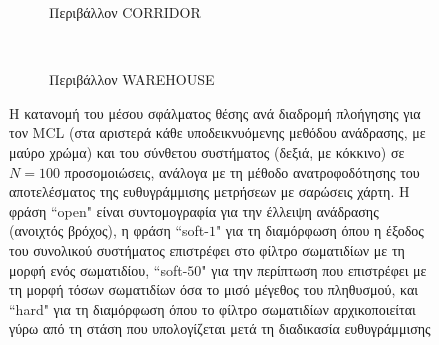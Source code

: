 \begin{figure}
  \vspace{2cm}
  \begin{subfigure}{\linewidth}
  \hspace{-1.25cm}
    
    \vspace{0.3cm}
    \caption{Περιβάλλον CORRIDOR}
    \label{}
  \end{subfigure}\\
  \begin{subfigure}{\linewidth}\vspace{0.5cm}
    \hspace{-1.25cm}
    
    \vspace{0.3cm}
    \caption{Περιβάλλον WAREHOUSE}
    \label{}
    \end{subfigure}
\caption{\small Η κατανομή του μέσου σφάλματος θέσης ανά διαδρομή πλοήγησης
         για τον MCL (στα αριστερά κάθε υποδεικνυόμενης μεθόδου ανάδρασης, με
         μαύρο χρώμα) και του σύνθετου συστήματος (δεξιά, με κόκκινο) σε
         $N=100$ προσομοιώσεις, ανάλογα με τη μέθοδο ανατροφοδότησης του
         αποτελέσματος της ευθυγράμμισης μετρήσεων με σαρώσεις χάρτη. Η φράση
         ``open" είναι συντομογραφία για την έλλειψη ανάδρασης (ανοιχτός
         βρόχος), η φράση ``soft-$1$" για τη διαμόρφωση όπου η έξοδος του
         συνολικού συστήματος επιστρέφει στο φίλτρο σωματιδίων με τη μορφή ενός
         σωματιδίου, ``soft-$50$" για την περίπτωση που επιστρέφει με τη μορφή
         τόσων σωματιδίων όσα το μισό μέγεθος του πληθυσμού, και ``hard" για τη
         διαμόρφωση όπου το φίλτρο σωματιδίων αρχικοποιείται γύρω από τη στάση
         που υπολογίζεται μετά τη διαδικασία ευθυγράμμισης}
\label{fig:02_02_04:feedbacks_position_zoomed}
\end{figure}
